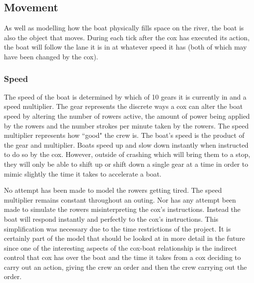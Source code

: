       \subsection{Movement}
      As well as modelling how the boat physically fills space on the river, the boat is also the object that moves. During each tick after the cox has executed its action, the boat will follow the lane it is in at whatever speed it has (both of which may have been changed by the cox).
      
      \subsubsection{Speed}
      The speed of the boat is determined by which of 10 gears it is currently in and a speed multiplier. The gear represents the discrete ways a cox can alter the boat speed by altering the number of rowers active, the amount of power being applied by the rowers and the number strokes per minute taken by the rowers. The speed multiplier represents how ``good" the crew is. The boat's speed is the product of the gear and multiplier. Boats speed up and slow down instantly when instructed to do so by the cox. However, outside of crashing which will bring them to a stop, they will only be able to shift up or shift down a single gear at a time in order to mimic slightly the time it takes to accelerate a boat.
      
      No attempt has been made to model the rowers getting tired. The speed multiplier remains constant throughout an outing. Nor has any attempt been made to simulate the rowers misinterpreting the cox's instructions. Instead the boat will respond instantly and perfectly to the cox's instructions. This simplification was necessary due to the time restrictions of the project. It is certainly part of the model that should be looked at in more detail in the future since one of the interesting aspects of the cox-boat relationship is the indirect control that cox has over the boat and the time it takes from a cox deciding to carry out an action, giving the crew an order and then the crew carrying out the order.
      
